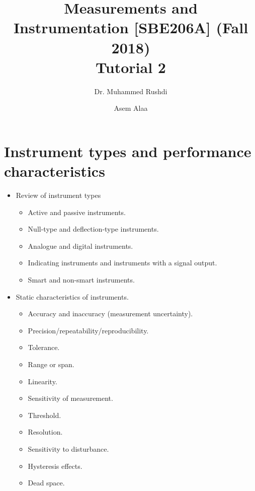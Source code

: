 \documentclass[a4paper,11pt,dvipsnames]{book}
\begin{document}
\author{Dr. Muhammed Rushdi \and Asem Alaa}

\title{Measurements and Instrumentation [SBE206A] (Fall 2018)\\ Tutorial 2}

\maketitle

\chapter*{Instrument types and performance characteristics}

\begin{itemize}
\item Review of instrument types
\begin{itemize}
\item Active and passive instruments.
\item Null-type and deflection-type instruments.
\item Analogue and digital instruments.
\item Indicating instruments and instruments with a signal output.
\item Smart and non-smart instruments.
\end{itemize}
\item Static characteristics of instruments.
\begin{itemize}
\item Accuracy and inaccuracy (measurement uncertainty).
\item Precision/repeatability/reproducibility.
\item Tolerance.
\item Range or span.
\item Linearity.
\item Sensitivity of measurement.
\item Threshold.
\item Resolution.
\item Sensitivity to disturbance.
\item Hysteresis effects.
\item Dead space.
\end{itemize}
\end{itemize}
\end{document}

